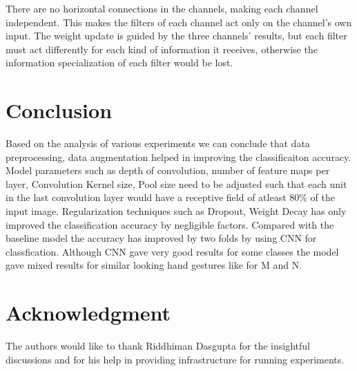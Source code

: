 \documentclass[conference]{IEEEtran}
\begin{document}
There are no horizontal connections in the channels, making each channel
independent. This makes the filters of each channel act only on the channel's
own input. The weight update is guided by the three channels' results, but each
filter must act differently for each kind of information it receives, otherwise the
information specialization of each filter would be lost.

\section{Conclusion}
Based on the analysis of various experiments we can conclude that data preprocessing, data augmentation helped in improving the classificaiton accuracy. Model parameters such as depth of convolution, number of feature maps per layer, Convolution Kernel size, Pool size need to be adjusted such that each unit in the last convolution layer would have a receptive field of atleast $80\%$ of the input image. Regularization techniques such as Dropout, Weight Decay has only improved the classification accuracy by negligible factors. Compared with the baseline model the accuracy has improved by two folds by using CNN for classfication. Although CNN gave very good results for some classes the model gave mixed results for similar looking hand gestures like for M and N.



\section*{Acknowledgment}


The authors would like to thank Riddhiman Dasgupta for the insightful discussions and for his help in providing infrastructure for running experiments.






\end{document}
